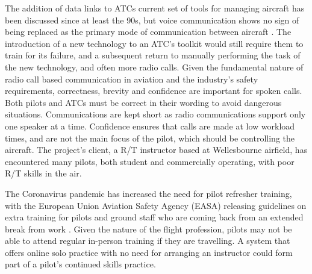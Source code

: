 The addition of data links to ATCs current set of tools for managing aircraft has been discussed since at least the 90s, but voice communication shows no sign of being replaced as the primary mode of communication between aircraft \cite{609472}. The introduction of a new technology to an ATC's toolkit would still require them to train for its failure, and a subsequent return to manually performing the task of the new technology, and often more radio calls. Given the fundamental nature of radio call based communication in aviation and the industry's safety requirements, correctness, brevity and confidence are important for spoken calls. Both pilots and ATCs must be correct in their wording to avoid dangerous situations. Communications are kept short as radio communications support only one speaker at a time. Confidence ensures that calls are made at low workload times, and are not the main focus of the pilot, which should be controlling the aircraft. The project's client, a R/T instructor based at Wellesbourne airfield, has encountered many pilots, both student and commercially operating, with poor R/T skills in the air.

The Coronavirus pandemic has increased the need for pilot refresher training, with the European Union Aviation Safety Agency (EASA) releasing guidelines on extra training for pilots and ground staff who are coming back from an extended break from work \cite{EASA-Training-Post-Covid}. Given the nature of the flight profession, pilots may not be able to attend regular in-person training if they are travelling. A system that offers online solo practice with no need for arranging an instructor could form part of a pilot’s continued skills practice.

